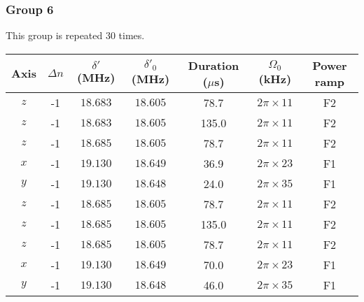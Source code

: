 \newpage
\subsubsection{Group 6}
This group is repeated 30 times.
\begin{center}
  \begin{tabular}{|c|c|c|c|c|c|c|}
    \hline
    Axis&$\Delta n$&$\delta'$ (MHz)&$\delta'_0$ (MHz)&Duration ($\mu$s)& $\Omega_0$ (kHz)&Power ramp\\\hline
    $z$&-1&$18.683$&$18.605$&78.7&$2\pi\times11$&F2\\\hline
    $z$&-1&$18.683$&$18.605$&135.0&$2\pi\times11$&F2\\\hline
    $z$&-1&$18.685$&$18.605$&78.7&$2\pi\times11$&F2\\\hline
    $x$&-1&$19.130$&$18.649$&36.9&$2\pi\times23$&F1\\\hline
    $y$&-1&$19.130$&$18.648$&24.0&$2\pi\times35$&F1\\\hline
    $z$&-1&$18.685$&$18.605$&78.7&$2\pi\times11$&F2\\\hline
    $z$&-1&$18.685$&$18.605$&135.0&$2\pi\times11$&F2\\\hline
    $z$&-1&$18.685$&$18.605$&78.7&$2\pi\times11$&F2\\\hline
    $x$&-1&$19.130$&$18.649$&70.0&$2\pi\times23$&F1\\\hline
    $y$&-1&$19.130$&$18.648$&46.0&$2\pi\times35$&F1\\\hline
  \end{tabular}
\end{center}
